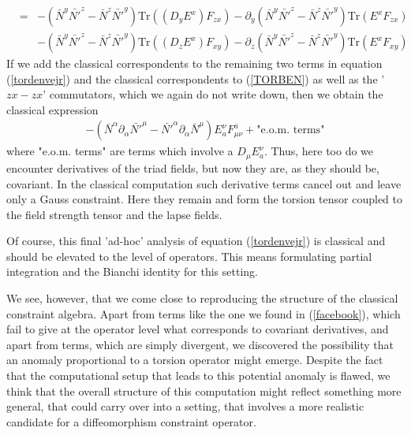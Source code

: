 \documentclass[12pt]{article}
\newcommand{\nn}{\nonumber}
\def\a{\alpha}
\def\m{\mu}
\def\n{\nu}
\newcommand{\pa}{\partial}
\begin{document}
\begin{appendix}
\begin{eqnarray}
%
&=&- \left( \bar{N}^y  \bar{N'}^z   - \bar{N}^z   \bar{N'}^y    \right) \mbox{Tr}\left( \left(  D_y E^x\right)  F_{zx} \right)  - \pa_y \left( \bar{N}^y  \bar{N'}^z   - \bar{N}^z   \bar{N'}^y    \right)\mbox{Tr}\left( E^x  F_{zx}     \right)
\nn\\
&& -\left( \bar{N}^y  \bar{N'}^z   - \bar{N}^z   \bar{N'}^y    \right) \mbox{Tr}\left(\left( D_z E^x\right)   F_{xy}      \right) -  \pa_z\left( \bar{N}^y  \bar{N'}^z   - \bar{N}^z   \bar{N'}^y    \right)\mbox{Tr}\left( E^x  F_{xy}   \right) 
\nn
\end{eqnarray}
If we add the classical correspondents to the remaining two terms in equation (\ref{tordenvejr}) and the classical correspondents to (\ref{TORBEN}) as well as the '$zx-zx$' commutators, which we again do not write down, then we obtain the classical expression
\begin{eqnarray}
-\left(  \bar{N}^\a \pa_\a \bar{N'}^\m -    \bar{N'}^\a \pa_\a \bar{N}^\m   \right) E^\n_a F^a_{\m\n} + \mbox{"e.o.m. terms"}
\end{eqnarray}
where "e.o.m. terms" are terms which involve a $D_\m E^\n_a$. Thus, here too do we encounter derivatives of the triad fields, but now they are, as they should be, covariant. In the classical computation such derivative terms cancel out and leave only a Gauss constraint. Here they remain and form the torsion tensor coupled to the field strength tensor and the lapse fields.%

Of course, this final 'ad-hoc' analysis of equation (\ref{tordenvejr}) is classical and should be elevated to the level of operators. This means formulating partial integration and the Bianchi identity for this setting.


We see, however, that we come close to reproducing the structure of the classical constraint algebra. Apart from terms like the one we found in (\ref{facebook}), which fail to give at the operator level what corresponds to covariant derivatives, and apart from terms, which are simply divergent, we discovered the possibility that an anomaly proportional to a torsion operator might emerge. Despite the fact that the computational setup that leads to this potential anomaly is flawed, we think that the overall structure of this computation might reflect something more general, that could carry over into a setting, that involves a more realistic candidate for a diffeomorphism constraint operator.


\end{appendix}
\end{document}
